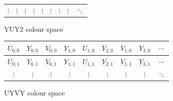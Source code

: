 \documentclass[12pt,a4paper,oneside,openright]{book}
\begin{document}
\begin{CJK}{UTF8}{}
\begin{figure}
\begin{center}
\begin{small}
\begin{tabular}{|c|c|c|c||c|c|c|c||c}
        $\vdots$ & $\vdots$ & $\vdots$ & $\vdots$ & $\vdots$ & $\vdots$ & $\vdots$ & $\vdots$ & $\ddots$
      \end{tabular}
    \end{small}
    \caption{YUY2 colour space~\citep{fourcc}\label{fig:yuy2}}
  \end{center}
\end{figure}
\begin{figure}
  \begin{center}
    \begin{small}
      \begin{tabular}{|c|c|c|c||c|c|c|c||c}\hline
        $U_{0,0}$ & $Y_{0,0}$ & $V_{0,0}$ & $Y_{1,0}$ & $U_{1,0}$ & $Y_{2,0}$ & $V_{1,0}$ & $Y_{3,0}$ & $\cdots$ \\\hline
        $U_{0,1}$ & $Y_{0,1}$ & $V_{0,1}$ & $Y_{1,1}$ & $U_{1,1}$ & $Y_{2,1}$ & $V_{1,1}$ & $Y_{3,1}$ & $\cdots$ \\\hline
        $\vdots$ & $\vdots$ & $\vdots$ & $\vdots$ & $\vdots$ & $\vdots$ & $\vdots$ & $\vdots$ & $\ddots$
      \end{tabular}
    \end{small}
    \caption{UYVY colour space~\citep{fourcc}\label{fig:uyvy}}
  \end{center}
\end{figure}


\end{CJK}
\end{document}
